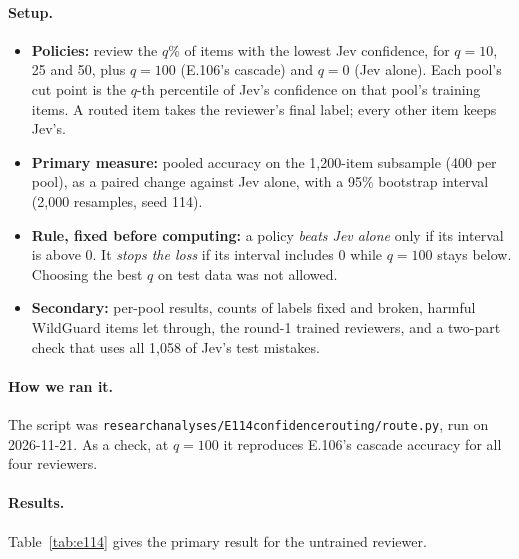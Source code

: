 \documentclass[11pt]{article}
\renewcommand{\_}{\origunderscore\allowbreak}
\begin{document}
\paragraph{Setup.}
\begin{itemize}[leftmargin=*]
  \item \textbf{Policies:} review the $q$\% of items with the lowest Jev confidence, for $q = 10$, 25 and 50, plus $q = 100$ (E.106's cascade) and $q = 0$ (Jev alone). Each pool's cut point is the $q$-th percentile of Jev's confidence on that pool's training items. A routed item takes the reviewer's final label; every other item keeps Jev's.
  \item \textbf{Primary measure:} pooled accuracy on the 1{,}200-item subsample (400 per pool), as a paired change against Jev alone, with a 95\% bootstrap interval (2{,}000 resamples, seed 114).
  \item \textbf{Rule, fixed before computing:} a policy \emph{beats Jev alone} only if its interval is above 0. It \emph{stops the loss} if its interval includes 0 while $q = 100$ stays below. Choosing the best $q$ on test data was not allowed.
  \item \textbf{Secondary:} per-pool results, counts of labels fixed and broken, harmful WildGuard items let through, the round-1 trained reviewers, and a two-part check that uses all 1{,}058 of Jev's test mistakes.
\end{itemize}

\paragraph{How we ran it.}
The script was \texttt{research\_analyses/E114\_confidence\_routing/route.py}, run on 2026-11-21. As a check, at $q = 100$ it reproduces E.106's cascade accuracy for all four reviewers.

\paragraph{Results.}
Table~\ref{tab:e114} gives the primary result for the untrained reviewer.
\end{document}
